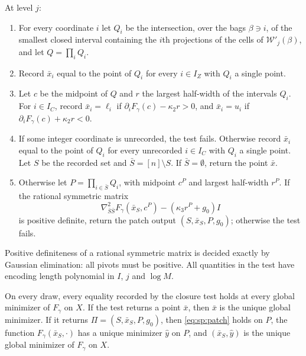 \begin{definition}\label{def:sp:closure}
At level $j$:
\begin{enumerate}[label=(\arabic*)]
\item For every coordinate $i$ let $Q_i$ be the intersection, over the bags
$\beta\ni i$, of the smallest closed interval containing the $i$th
projections of the cells of $\mathcal W'_j(\beta)$, and let
$Q=\prod_iQ_i$.
\item Record $\bar x_i$ equal to the point of $Q_i$ for every $i\in I_Z$ with
$Q_i$ a single point.
\item Let $c$ be the midpoint of $Q$ and $r$ the largest half-width of the
intervals $Q_i$. For $i\in I_C$, record $\bar x_i=\ell_i$ if
$\partial_iF_\gamma(c)-\kappa_2r>0$, and $\bar x_i=u_i$ if
$\partial_iF_\gamma(c)+\kappa_2r<0$.
\item If some integer coordinate is unrecorded, the test fails. Otherwise
record $\bar x_i$ equal to the point of $Q_i$ for every unrecorded $i\in I_C$
with $Q_i$ a single point. Let $S$ be the recorded set and $\bar S=[n]\setminus S$.
If $\bar S=\emptyset$, return the point $\bar x$.
\item Otherwise let $P=\prod_{i\in\bar S}Q_i$, with midpoint $c^P$ and
largest half-width $r^P$. If the rational symmetric matrix
\begin{equation}\label{eq:sp:matrix}
 \nabla^2_{\bar S\bar S}F_\gamma(\bar x_S,c^P)-(\kappa_3r^P+g_0)I
\end{equation}
is positive definite, return the patch output $(S,\bar x_S,P,g_0)$;
otherwise the test fails.
\end{enumerate}
\end{definition}

Positive definiteness of a rational symmetric matrix is decided exactly by
Gaussian elimination: all pivots must be positive. All quantities in the test
have encoding length polynomial in $I$, $j$ and $\log M$.

\begin{proposition}\label{prop:sp:closure-sound}
On every draw, every equality recorded by the closure test holds at every
global minimizer of $F_\gamma$ on $X$. If the test returns a point $\bar x$,
then $\bar x$ is the unique global minimizer. If it returns
$\Pi=(S,\bar x_S,P,g_0)$, then \eqref{eq:sp:patch} holds on $P$, the function
$F_\gamma(\bar x_S,\cdot)$ has a unique minimizer $\hat y$ on $P$, and
$(\bar x_S,\hat y)$ is the unique global minimizer of $F_\gamma$ on $X$.
\end{proposition}

